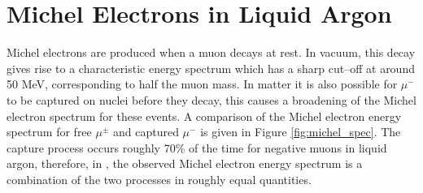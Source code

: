 \section{Michel Electrons in Liquid Argon} \label{ME_LAr}
Michel electrons are produced when a muon decays at rest. In vacuum, this 
decay gives rise to a characteristic energy spectrum which has a sharp 
cut--off at around 50 MeV, corresponding to half the muon mass. In matter it 
is also possible for $\mu^-$ to be captured on nuclei before they decay, this 
causes a broadening of the Michel electron spectrum for these events. A 
comparison of the Michel electron energy spectrum for free $\mu^\pm$ and 
captured $\mu^-$ is given in Figure \ref{fig:michel_spec}. The capture process 
occurs roughly 70\% of the time for negative muons in liquid argon, therefore, 
in \protodune{}, the observed Michel electron energy spectrum is a combination 
of the two processes in roughly equal quantities.  
